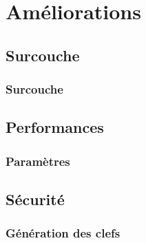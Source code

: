 \section{Améliorations}

\subsection{Surcouche}

\begin{frame}
\frametitle{Surcouche}
\end{frame}

\subsection{Performances}

\begin{frame}
\frametitle{Paramètres}
\end{frame}

\subsection{Sécurité}

\begin{frame}
\frametitle{Génération des clefs}
\end{frame}